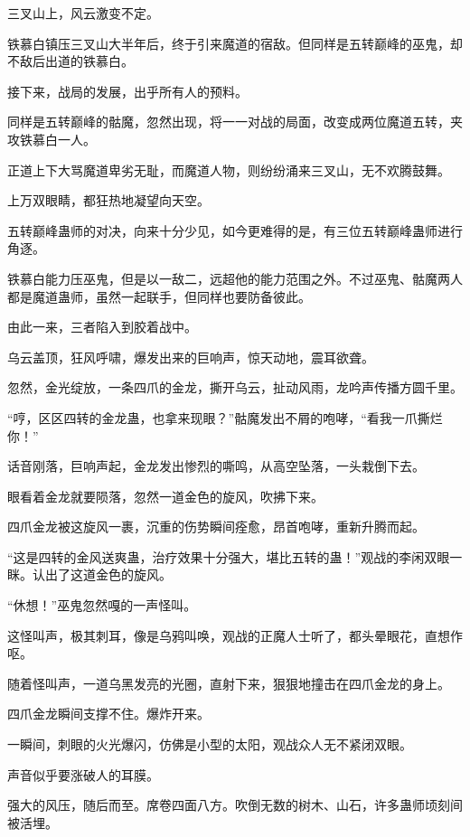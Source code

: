 
\begin{this_body}

三叉山上，风云激变不定。

铁慕白镇压三叉山大半年后，终于引来魔道的宿敌。但同样是五转巅峰的巫鬼，却不敌后出道的铁慕白。

接下来，战局的发展，出乎所有人的预料。

同样是五转巅峰的骷魔，忽然出现，将一一对战的局面，改变成两位魔道五转，夹攻铁慕白一人。

正道上下大骂魔道卑劣无耻，而魔道人物，则纷纷涌来三叉山，无不欢腾鼓舞。

上万双眼睛，都狂热地凝望向天空。

五转巅峰蛊师的对决，向来十分少见，如今更难得的是，有三位五转巅峰蛊师进行角逐。

铁慕白能力压巫鬼，但是以一敌二，远超他的能力范围之外。不过巫鬼、骷魔两人都是魔道蛊师，虽然一起联手，但同样也要防备彼此。

由此一来，三者陷入到胶着战中。

乌云盖顶，狂风呼啸，爆发出来的巨响声，惊天动地，震耳欲聋。

忽然，金光绽放，一条四爪的金龙，撕开乌云，扯动风雨，龙吟声传播方圆千里。

“哼，区区四转的金龙蛊，也拿来现眼？”骷魔发出不屑的咆哮，“看我一爪撕烂你！”

话音刚落，巨响声起，金龙发出惨烈的嘶鸣，从高空坠落，一头栽倒下去。

眼看着金龙就要陨落，忽然一道金色的旋风，吹拂下来。

四爪金龙被这旋风一裹，沉重的伤势瞬间痊愈，昂首咆哮，重新升腾而起。

“这是四转的金风送爽蛊，治疗效果十分强大，堪比五转的蛊！”观战的李闲双眼一眯。认出了这道金色的旋风。

“休想！”巫鬼忽然嘎的一声怪叫。

这怪叫声，极其刺耳，像是乌鸦叫唤，观战的正魔人士听了，都头晕眼花，直想作呕。

随着怪叫声，一道乌黑发亮的光圈，直射下来，狠狠地撞击在四爪金龙的身上。

四爪金龙瞬间支撑不住。爆炸开来。

一瞬间，刺眼的火光爆闪，仿佛是小型的太阳，观战众人无不紧闭双眼。

声音似乎要涨破人的耳膜。

强大的风压，随后而至。席卷四面八方。吹倒无数的树木、山石，许多蛊师顷刻间被活埋。


\end{this_body}
